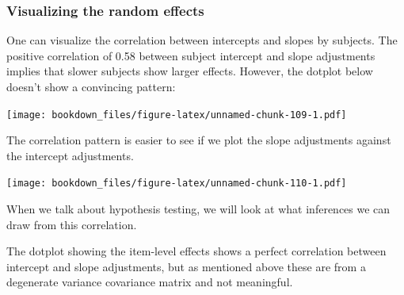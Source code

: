 \documentclass[12pt,]{krantz}
\newenvironment{Shaded}{\begin{snugshade}}{\end{snugshade}}
\newcommand{\DataTypeTok}[1]{\textcolor[rgb]{0.13,0.29,0.53}{#1}}
\newcommand{\DecValTok}[1]{\textcolor[rgb]{0.00,0.00,0.81}{#1}}
\newcommand{\KeywordTok}[1]{\textcolor[rgb]{0.13,0.29,0.53}{\textbf{#1}}}
\newcommand{\NormalTok}[1]{#1}
\newcommand{\OperatorTok}[1]{\textcolor[rgb]{0.81,0.36,0.00}{\textbf{#1}}}
\newcommand{\OtherTok}[1]{\textcolor[rgb]{0.56,0.35,0.01}{#1}}
\newcommand{\StringTok}[1]{\textcolor[rgb]{0.31,0.60,0.02}{#1}}
\begin{document}
\hypertarget{visualizing-the-random-effects}{%
\subsubsection{Visualizing the random effects}\label{visualizing-the-random-effects}}

One can visualize the correlation between intercepts and slopes by subjects. The positive correlation of 0.58 between subject intercept and slope adjustments implies that slower subjects show larger effects. However, the dotplot below doesn't show a convincing pattern:

\begin{Shaded}
\end{Shaded}

\texttt{[image: bookdown\_files/figure-latex/unnamed-chunk-109-1.pdf]}

The correlation pattern is easier to see if we plot the slope adjustments against the intercept adjustments.

\begin{Shaded}
\end{Shaded}

\texttt{[image: bookdown\_files/figure-latex/unnamed-chunk-110-1.pdf]}

When we talk about hypothesis testing, we will look at what inferences we can draw from this correlation.

The dotplot showing the item-level effects shows a perfect correlation between intercept and slope adjustments, but as mentioned above these are from a degenerate variance covariance matrix and not meaningful.

\begin{Shaded}
\end{Shaded}
\end{document}
